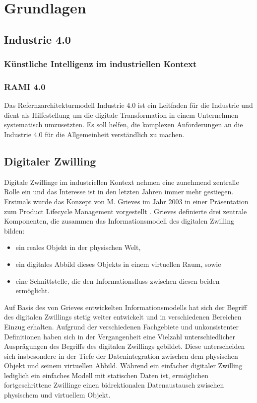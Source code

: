 \section{Grundlagen}
\subsection{Industrie 4.0}





\subsubsection{Künstliche Intelligenz im industriellen Kontext}
\subsubsection{RAMI 4.0}
Das Refernzarchitekturmodell Industrie 4.0 ist ein Leitfaden für die Industrie und dient als Hilfestellung um die digitale Transformation in einem Unternehmen systematisch umzusetzten.
Es soll helfen, die komplexen Anforderungen an die Industrie 4.0 für die Allgemeinheit verständlich zu machen.


\newpage
\subsection{Digitaler Zwilling}
Digitale Zwillinge im industriellen Kontext nehmen eine zunehmend zentralle Rolle ein und das Interesse ist in den letzten Jahren immer mehr gestiegen.
Erstmals wurde das Konzept von M. Grieves im Jahr 2003 in einer Präsentation zum Product Lifecycle Management vorgestellt \cite{DTGrieves}. 
Grieves definierte drei zentrale Komponenten, die zusammen das Informationsmodell des digitalen Zwilling bilden:
\begin{itemize}
    \item ein reales Objekt in der physischen Welt,
    \item ein digitales Abbild dieses Objekts in einem virtuellen Raum, sowie
    \item eine Schnittstelle, die den Informationsfluss zwischen diesen beiden ermöglicht.
\end{itemize}

Auf Basis des von Grieves entwickelten Informationsmodells hat sich der Begriff des digitalen Zwillings stetig weiter entwickelt und in verschiedenen Bereichen Einzug erhalten. 
Aufgrund der verschiedenen Fachgebiete und unkonsistenter Definitionen haben sich in der Vergangenheit eine Vielzahl unterschiedlicher Ausprägungen des Begriffs des digitalen Zwillings gebildet.
Diese unterscheiden sich insbesondere in der Tiefe der Datenintegration zwischen dem physischen Objekt und seinem virtuellen Abbild.
Während ein einfacher digitaler Zwilling lediglich ein einfaches Modell mit statischen Daten ist, ermöglichen fortgeschrittene Zwillinge einen bidrektionalen Datenaustausch zwischen physischem und virtuellem Objekt. 

